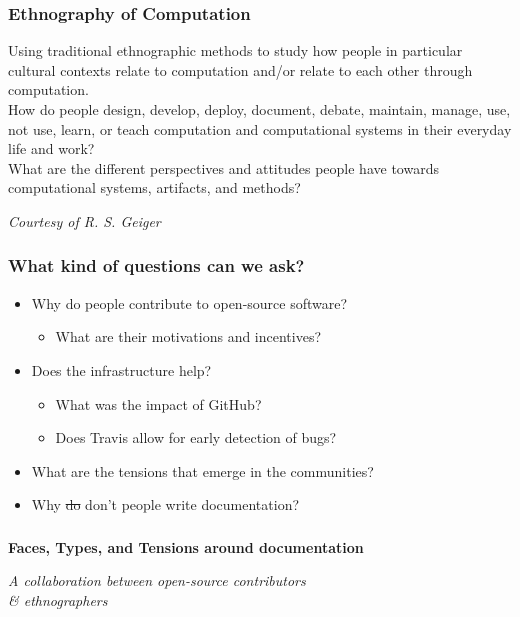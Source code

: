 \documentclass[xcolor=dvipsnames]{beamer}
\begin{document}
\begin{frame}
\frametitle{Ethnography of Computation}

Using traditional ethnographic methods to study how people in particular
cultural contexts relate to computation and/or relate to each other
through computation.  \\
\vspace{1em}
How do people design, develop, deploy, document,
debate, maintain, manage, use, not use, learn, or teach computation and
computational systems in their everyday life and work? 
\\
\vspace{1em}
What are the
different perspectives and attitudes people have towards computational
systems, artifacts, and methods?
\vspace{3em}
\begin{flushright}
\footnotesize
\em
Courtesy of R. S. Geiger
\end{flushright}
\end{frame}

\begin{frame}
\frametitle{What kind of questions can we ask?}

\begin{itemize}[label={$\bullet$}]
\item Why do people contribute to open-source software?
\begin{itemize}[label={$\bullet$}]
\item What are their motivations and incentives?
\end{itemize}
\item Does the infrastructure help? 
\begin{itemize}[label={$\bullet$}]
\item What was the impact of GitHub?
\item Does Travis allow for early detection of bugs?
\end{itemize}
\item What are the tensions that emerge in the communities?
\item Why \sout{do} don't people write documentation?
\end{itemize}
\end{frame}

\begin{frame}
\frametitle{}
{\Large \bf Faces, Types, and Tensions around documentation}
\begin{flushright}
{\em A collaboration between open-source contributors \\
\& ethnographers}
\end{flushright}
\end{frame}
\end{document}
